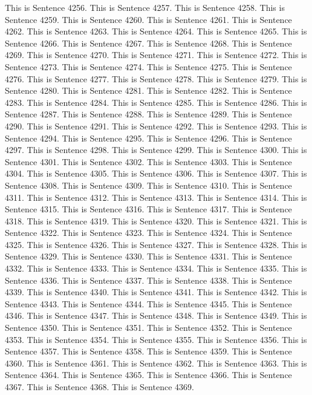 \documentclass{article}
\begin{document}
This is Sentence 4256.
This is Sentence 4257.
This is Sentence 4258.
This is Sentence 4259.
This is Sentence 4260.
This is Sentence 4261.
This is Sentence 4262.
This is Sentence 4263.
This is Sentence 4264.
This is Sentence 4265.
This is Sentence 4266.
This is Sentence 4267.
This is Sentence 4268.
This is Sentence 4269.
This is Sentence 4270.
This is Sentence 4271.
This is Sentence 4272.
This is Sentence 4273.
This is Sentence 4274.
This is Sentence 4275.
This is Sentence 4276.
This is Sentence 4277.
This is Sentence 4278.
This is Sentence 4279.
This is Sentence 4280.
This is Sentence 4281.
This is Sentence 4282.
This is Sentence 4283.
This is Sentence 4284.
This is Sentence 4285.
This is Sentence 4286.
This is Sentence 4287.
This is Sentence 4288.
This is Sentence 4289.
This is Sentence 4290.
This is Sentence 4291.
This is Sentence 4292.
This is Sentence 4293.
This is Sentence 4294.
This is Sentence 4295.
This is Sentence 4296.
This is Sentence 4297.
This is Sentence 4298.
This is Sentence 4299.
This is Sentence 4300.
This is Sentence 4301.
This is Sentence 4302.
This is Sentence 4303.
This is Sentence 4304.
This is Sentence 4305.
This is Sentence 4306.
This is Sentence 4307.
This is Sentence 4308.
This is Sentence 4309.
This is Sentence 4310.
This is Sentence 4311.
This is Sentence 4312.
This is Sentence 4313.
This is Sentence 4314.
This is Sentence 4315.
This is Sentence 4316.
This is Sentence 4317.
This is Sentence 4318.
This is Sentence 4319.
This is Sentence 4320.
This is Sentence 4321.
This is Sentence 4322.
This is Sentence 4323.
This is Sentence 4324.
This is Sentence 4325.
This is Sentence 4326.
This is Sentence 4327.
This is Sentence 4328.
This is Sentence 4329.
This is Sentence 4330.
This is Sentence 4331.
This is Sentence 4332.
This is Sentence 4333.
This is Sentence 4334.
This is Sentence 4335.
This is Sentence 4336.
This is Sentence 4337.
This is Sentence 4338.
This is Sentence 4339.
This is Sentence 4340.
This is Sentence 4341.
This is Sentence 4342.
This is Sentence 4343.
This is Sentence 4344.
This is Sentence 4345.
This is Sentence 4346.
This is Sentence 4347.
This is Sentence 4348.
This is Sentence 4349.
This is Sentence 4350.
This is Sentence 4351.
This is Sentence 4352.
This is Sentence 4353.
This is Sentence 4354.
This is Sentence 4355.
This is Sentence 4356.
This is Sentence 4357.
This is Sentence 4358.
This is Sentence 4359.
This is Sentence 4360.
This is Sentence 4361.
This is Sentence 4362.
This is Sentence 4363.
This is Sentence 4364.
This is Sentence 4365.
This is Sentence 4366.
This is Sentence 4367.
This is Sentence 4368.
This is Sentence 4369.
\end{document}

